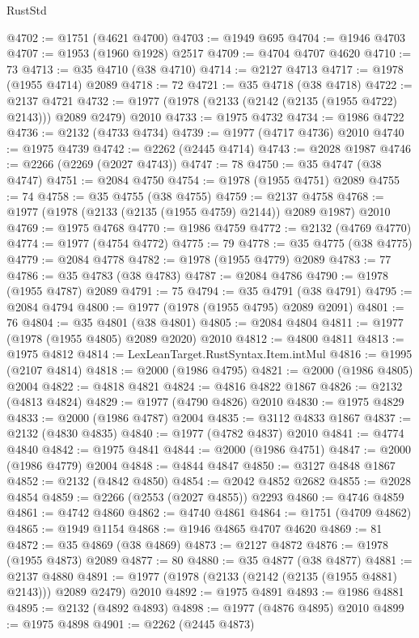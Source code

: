 \begin{lexlean}{RustStd}
\begin{coremodule}
@4702 := @1751 (@4621 @4700)
@4703 := @1949 @695
@4704 := @1946 @4703
@4707 := @1953 (@1960 @1928) @2517
@4709 := @4704 @4707 @4620
@4710 := 73
@4713 := @35 @4710 (@38 @4710)
@4714 := @2127 @4713
@4717 := @1978 (@1955 @4714) @2089
@4718 := 72
@4721 := @35 @4718 (@38 @4718)
@4722 := @2137 @4721
@4732 := @1977 (@1978 (@2133 (@2142 (@2135 (@1955 @4722) @2143))) @2089 @2479) @2010
@4733 := @1975 @4732
@4734 := @1986 @4722
@4736 := @2132 (@4733 @4734)
@4739 := @1977 (@4717 @4736) @2010
@4740 := @1975 @4739
@4742 := @2262 (@2445 @4714)
@4743 := @2028 @1987
@4746 := @2266 (@2269 (@2027 @4743))
@4747 := 78
@4750 := @35 @4747 (@38 @4747)
@4751 := @2084 @4750
@4754 := @1978 (@1955 @4751) @2089
@4755 := 74
@4758 := @35 @4755 (@38 @4755)
@4759 := @2137 @4758
@4768 := @1977 (@1978 (@2133 (@2135 (@1955 @4759) @2144)) @2089 @1987) @2010
@4769 := @1975 @4768
@4770 := @1986 @4759
@4772 := @2132 (@4769 @4770)
@4774 := @1977 (@4754 @4772)
@4775 := 79
@4778 := @35 @4775 (@38 @4775)
@4779 := @2084 @4778
@4782 := @1978 (@1955 @4779) @2089
@4783 := 77
@4786 := @35 @4783 (@38 @4783)
@4787 := @2084 @4786
@4790 := @1978 (@1955 @4787) @2089
@4791 := 75
@4794 := @35 @4791 (@38 @4791)
@4795 := @2084 @4794
@4800 := @1977 (@1978 (@1955 @4795) @2089 @2091)
@4801 := 76
@4804 := @35 @4801 (@38 @4801)
@4805 := @2084 @4804
@4811 := @1977 (@1978 (@1955 @4805) @2089 @2020) @2010
@4812 := @4800 @4811
@4813 := @1975 @4812
@4814 := LexLeanTarget.RustSyntax.Item.intMul
@4816 := @1995 (@2107 @4814)
@4818 := @2000 (@1986 @4795)
@4821 := @2000 (@1986 @4805) @2004
@4822 := @4818 @4821
@4824 := @4816 @4822 @1867
@4826 := @2132 (@4813 @4824)
@4829 := @1977 (@4790 @4826) @2010
@4830 := @1975 @4829
@4833 := @2000 (@1986 @4787) @2004
@4835 := @3112 @4833 @1867
@4837 := @2132 (@4830 @4835)
@4840 := @1977 (@4782 @4837) @2010
@4841 := @4774 @4840
@4842 := @1975 @4841
@4844 := @2000 (@1986 @4751)
@4847 := @2000 (@1986 @4779) @2004
@4848 := @4844 @4847
@4850 := @3127 @4848 @1867
@4852 := @2132 (@4842 @4850)
@4854 := @2042 @4852 @2682
@4855 := @2028 @4854
@4859 := @2266 (@2553 (@2027 @4855)) @2293
@4860 := @4746 @4859
@4861 := @4742 @4860
@4862 := @4740 @4861
@4864 := @1751 (@4709 @4862)
@4865 := @1949 @1154
@4868 := @1946 @4865 @4707 @4620
@4869 := 81
@4872 := @35 @4869 (@38 @4869)
@4873 := @2127 @4872
@4876 := @1978 (@1955 @4873) @2089
@4877 := 80
@4880 := @35 @4877 (@38 @4877)
@4881 := @2137 @4880
@4891 := @1977 (@1978 (@2133 (@2142 (@2135 (@1955 @4881) @2143))) @2089 @2479) @2010
@4892 := @1975 @4891
@4893 := @1986 @4881
@4895 := @2132 (@4892 @4893)
@4898 := @1977 (@4876 @4895) @2010
@4899 := @1975 @4898
@4901 := @2262 (@2445 @4873)

\end{coremodule}
\end{lexlean}
